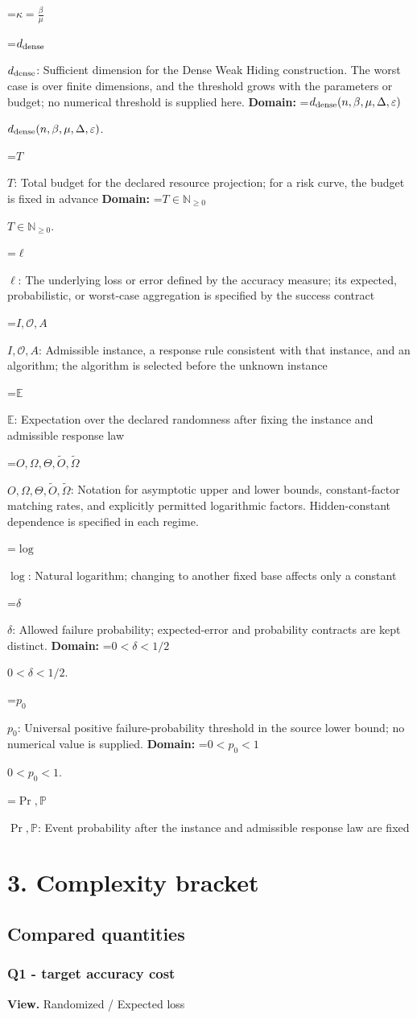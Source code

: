 \documentclass[10pt,a4paper]{article}
\newcommand{\AtlasMath}[1]{\par\begingroup\centering\setbox0=\hbox{$\displaystyle #1$}\ifdim\wd0>1.4\linewidth\typeout{ATLAS WIDE FORMULA: \the\wd0}\fi\ifdim\wd0>\linewidth\resizebox{\linewidth}{!}{\box0}\else\box0\fi\par\endgroup}
\newcommand{\AtlasInlineMath}[1]{\begingroup\setbox0=\hbox{$#1$}\ifdim\wd0>.4\linewidth\endgroup\AtlasMath{#1}\else\endgroup$#1$\fi}
\begin{document}
\AtlasMath{\kappa=\frac{\beta}{\mu}}


\AtlasInlineMath{d_{\rm dense}}: Sufficient dimension for the Dense Weak Hiding construction. The worst case is over finite dimensions, and the threshold grows with the parameters or budget; no numerical threshold is supplied here. \textbf{Domain:} \AtlasInlineMath{d_{\rm dense}(n,\beta,\mu,\Delta,\varepsilon)}.

\AtlasInlineMath{T}: Total budget for the declared resource projection; for a risk curve, the budget is fixed in advance \textbf{Domain:} \AtlasInlineMath{T\in\mathbb{N}_{\ge0}}.

\AtlasInlineMath{\ell}: The underlying loss or error defined by the accuracy measure; its expected, probabilistic, or worst-case aggregation is specified by the success contract

\AtlasInlineMath{I,\mathcal{O},A}: Admissible instance, a response rule consistent with that instance, and an algorithm; the algorithm is selected before the unknown instance

\AtlasInlineMath{\mathbb{E}}: Expectation over the declared randomness after fixing the instance and admissible response law

\AtlasInlineMath{O,\Omega,\Theta,\widetilde{O},\widetilde\Omega}: Notation for asymptotic upper and lower bounds, constant-factor matching rates, and explicitly permitted logarithmic factors. Hidden-constant dependence is specified in each regime.

\AtlasInlineMath{\log}: Natural logarithm; changing to another fixed base affects only a constant

\AtlasInlineMath{\delta}: Allowed failure probability; expected-error and probability contracts are kept distinct. \textbf{Domain:} \AtlasInlineMath{0<\delta<1/2}.

\AtlasInlineMath{p_0}: Universal positive failure-probability threshold in the source lower bound; no numerical value is supplied. \textbf{Domain:} \AtlasInlineMath{0<p_0<1}.

\AtlasInlineMath{\Pr,\mathbb{P}}: Event probability after the instance and admissible response law are fixed

\section{3. Complexity bracket}
\subsection{Compared quantities}
\subsubsection{Q1 - target accuracy cost}
\textbf{View.} Randomized / Expected loss
\end{document}
